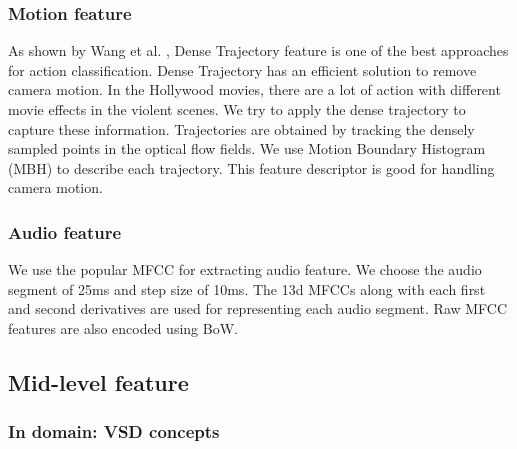 \documentclass[review]{elsarticle}
\begin{document}
\subsubsection{Motion feature}
As shown by Wang et al. \cite{wang_dense}, Dense Trajectory feature is one of the best approaches for action classification. Dense Trajectory has an efficient solution to remove camera motion. In the Hollywood movies, there are a lot of action with different movie effects in the violent scenes. We try to apply the dense trajectory  to capture these information. Trajectories are obtained by tracking the densely sampled points in the optical flow fields. We use Motion Boundary Histogram (MBH) to describe each trajectory. This feature descriptor is good for handling camera motion. 
\subsubsection{Audio feature}
We use the popular MFCC for extracting audio feature. We choose the audio segment of 25ms and step size of 10ms. The 13d MFCCs along with each first and second derivatives are used for representing each audio segment. Raw MFCC features are also encoded using BoW. 

\subsection{Mid-level feature}
\subsubsection{In domain: VSD concepts}
\end{document}
